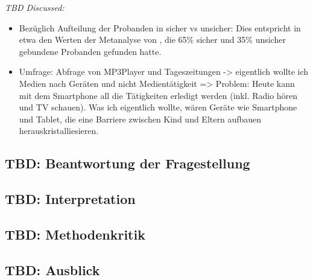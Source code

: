 \textit{TBD Discussed:}
\begin{itemize}
    \item Bezüglich Aufteilung der Probanden in sicher vs unsicher: Dies entspricht in etwa den Werten der Metanalyse von , die 65\% sicher und 35\% unsicher gebundene Probanden gefunden hatte.
    \item Umfrage: Abfrage von MP3Player und Tageszeitungen -> eigentlich wollte ich Medien nach Geräten und nicht Medientätigkeit => Problem: Heute kann mit dem Smartphone all die Tätigkeiten erledigt werden (inkl. Radio hören und TV schauen). Was ich eigentlich wollte, wären Geräte wie Smartphone und Tablet, die eine Barriere zwischen Kind und Eltern aufbauen herauskristalliesieren.
\end{itemize}


\subsection{TBD: Beantwortung der Fragestellung} \label{sec:BeantwortungFragestellung}

\subsection{TBD: Interpretation} \label{sec:Interpretation}

\subsection{TBD: Methodenkritik} \label{sec:Methodenkritik}

\subsection{TBD: Ausblick} \label{sec:Ausblick}